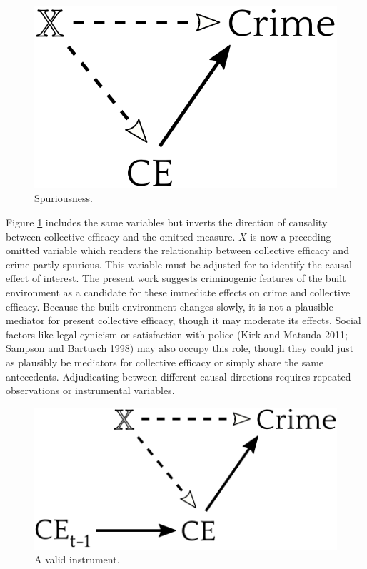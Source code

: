\documentclass [11pt, proquest] {uwthesis}[2015/03/03]
\begin{document}
\linebreak
\begin{figure}

{\centering \includegraphics[width=0.4\linewidth]{./figure/appendix/2_spuriousness} 

}

\caption{Spuriousness.}\label{fig:dag2}
\end{figure}
Figure \ref{fig:dag2} includes the same variables but inverts the direction of causality between collective efficacy and the omitted measure. \(X\) is now a preceding omitted variable which renders the relationship between collective efficacy and crime partly spurious. This variable must be adjusted for to identify the causal effect of interest. The present work suggests criminogenic features of the built environment as a candidate for these immediate effects on crime and collective efficacy. Because the built environment changes slowly, it is not a plausible mediator for present collective efficacy, though it may moderate its effects. Social factors like legal cynicism or satisfaction with police (Kirk and Matsuda 2011; Sampson and Bartusch 1998) may also occupy this role, though they could just as plausibly be mediators for collective efficacy or simply share the same antecedents. Adjudicating between different causal directions requires repeated observations or instrumental variables.\linebreak
\linebreak
\begin{figure}

{\centering \includegraphics[width=0.5\linewidth]{./figure/appendix/3_instrument} 

}

\caption{A valid instrument.}\label{fig:dag3}
\end{figure}
\end{document}
